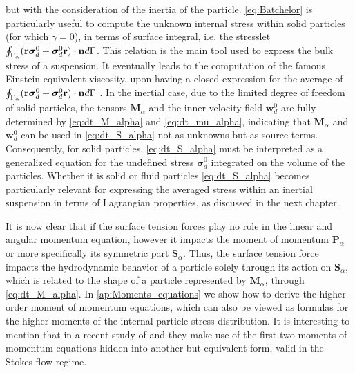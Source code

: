 but with the consideration of the inertia of the particle.
\ref{eq:Batchelor} is particularly useful to compute the unknown internal stress within solid particles (for which $\gamma = 0$), in terms of surface integral, i.e. the stresslet $\oint_{\Gamma_{\alpha}} (\textbf{r}\bm\sigma_d^0+ \bm\sigma_d^0\textbf{r})\cdot \textbf{n} d\Gamma$.
This relation is the main tool used to express the bulk stress of a suspension.
It eventually leads to the computation of the famous Einstein equivalent viscosity, upon having a closed expression for the average of $\oint_{\Gamma_{\alpha}} (\textbf{r}\bm\sigma_d^0+ \bm\sigma_d^0\textbf{r})\cdot \textbf{n} d\Gamma$ \citep{guazzelli2011}. 
In the inertial case, due to the limited degree of freedom of solid particles, the tensors $\textbf{M}_\alpha$ and the inner velocity field $\textbf{w}_d^0$ are fully determined by \ref{eq:dt_M_alpha} and \ref{eq:dt_mu_alpha}, indicating that $\textbf{M}_\alpha$ and $\textbf{w}_d^0$ can be used in \ref{eq:dt_S_alpha} not as unknowns but as source terms. 
Consequently, for solid particles, \ref{eq:dt_S_alpha} must be interpreted as a generalized equation for the undefined stress $\bm\sigma_d^0$ integrated on the volume of the particles.
Whether it is solid or fluid particles \ref{eq:dt_S_alpha} becomes particularly relevant for expressing the averaged stress within an inertial suspension in terms of Lagrangian properties, as discussed in the next chapter. 

It is now clear that if the surface tension forces play no role in the linear and angular momentum equation, however it impacts the moment of momentum $\textbf{P}_\alpha$ or more specifically its symmetric part $\textbf{S}_\alpha$.
Thus, the surface tension force impacts the hydrodynamic behavior of a particle solely through its action on $\textbf{S}_\alpha$, which is related to the shape of a particle represented by $\textbf{M}_\alpha$, through \ref{eq:dt_M_alpha}.
In \ref{ap:Moments_equations} we show how to derive the higher-order moment of momentum equations, which can also be viewed as formulas for the higher moments of the internal particle stress distribution. 
It is interesting to mention that in a recent study of \citet{dolata2021faxen} and \citet{zhou2020lamb} they make use of the first two moments of momentum equations hidden into another but equivalent form, valid in the Stokes flow regime. 


